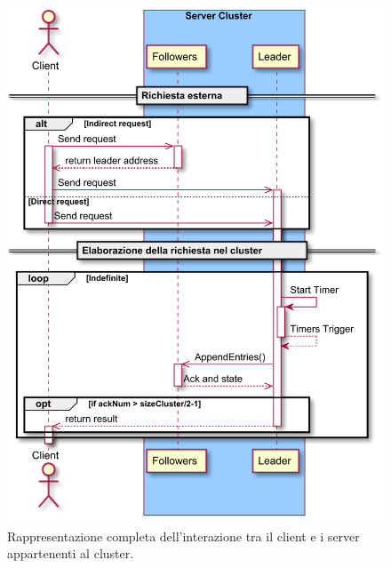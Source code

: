 	  \begin{figure}[H]
	    \centering
	    \includegraphics[width=0.90\columnwidth]{../plantuml/rendered/seqDiagrams/ClientRequest}
	    \caption{Rappresentazione completa dell'interazione tra il client e i server appartenenti al cluster.}
	    \label{fig:figure 14}
	  \end{figure} 
